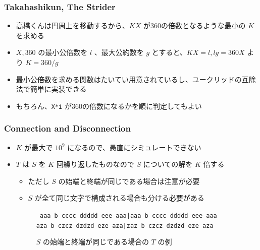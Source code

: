 \documentclass[t, aspectratio=169, dvipdfmx]{beamer}
\begin{document}
\begin{frame}[containsverbatim]
  \frametitle{Takahashikun, The Strider}
  \begin{itemize}
    \item 高橋くんは円周上を移動するから、$KX$ が360の倍数となるような最小の $K$ を求める
    \item $X,360$ の最小公倍数を $l$ 、最大公約数を $g$ とすると、$KX=l, lg=360X$ より $K=360/g$
    \item 最小公倍数を求める関数はたいてい用意されているし、ユークリッドの互除法で簡単に実装できる
    \item もちろん、\verb|X*i| が360の倍数になるかを順に判定してもよい
  \end{itemize}
\end{frame}

\begin{frame}[c]
\end{frame}

\begin{frame}[containsverbatim]
  \frametitle{Connection and Disconnection}
  \begin{itemize}
    \item $K$ が最大で $10^9$ になるので、愚直にシミュレートできない
    \item $T$ は $S$ を $K$ 回繰り返したものなので $S$ についての解を $K$ 倍する
    \begin{itemize}
      \item ただし $S$ の始端と終端が同じである場合は注意が必要
      \item $S$ が全て同じ文字で構成される場合も分ける必要がある
    \end{itemize}
    \begin{figure}[b]
      \caption{$S$ の始端と終端が同じである場合の $T$ の例}
        \begin{center}\tt
          aaa b cccc ddddd eee aaa|aaa b cccc ddddd eee aaa \\
          aza b czcz dzdzd eze aza|zaz b czcz dzdzd eze aza
        \end{center}
    \end{figure}
  \end{itemize}
\end{frame}
\end{document}
